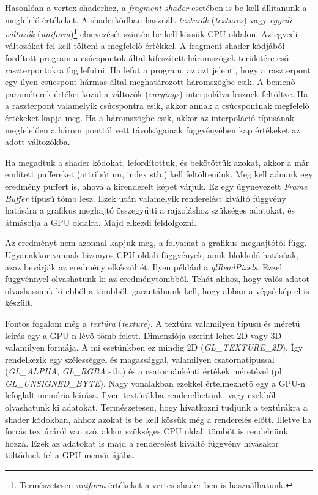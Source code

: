 \documentclass[12pt]{report}
\theoremstyle{definition}
\newcommand{\inenglish}[1]{\textsl{#1}}
\newcommand{\func}[1]{{\textsl{#1}}}
\begin{document}
Hasonlóan a vertex shaderhez, a \emph{fragment shader} esetében is be kell
állítanunk a megfelelő értékeket. A shaderkódban használt \emph{texturák}
(\inenglish{textures}) vagy \emph{egyedi változók}
(\inenglish{uniform})\footnote{Természetesen \func{uniform} értékeket a vertes
shader-ben is használhatunk.} elnevezését szintén be kell kössük CPU oldalon.
Az egyedi változókat fel kell tölteni a megfelelő értékkel. A fragment shader
kódjából fordított program a csúcspontok által kifeszített háromszögek
területére eső raszterpontokra fog lefutni.  Ha lefut a program, az azt
jelenti, hogy a raszterpont egy ilyen csúcspont-hármas által meghatározott
háromszögbe esik. A bemenő paraméterek értékei közül a változók
(\inenglish{varyings}) interpolálva lesznek feltöltve. Ha a raszterpont
valamelyik csúcspontra esik, akkor annak a csúcspontnak megfelelő értékeket
kapja meg. Ha a háromszögbe esik, akkor az interpoláció típusának megfelelően a
három ponttól vett távolságainak függvényében kap értékeket az adott
változókba.

Ha megadtuk a shader kódokat, lefordítottuk, és bekötöttük azokat, akkor a már
említett puffereket (attribútum, index stb.) kell feltöltenünk. Meg kell adnunk
egy eredmény puffert is, ahová a kirenderelt képet várjuk. Ez egy úgynevezett
\func{Frame Buffer} típusú tömb lesz. Ezek után valamelyik renderelést kiváltó
függvény hatására a grafikus meghajtó összegyűjti a rajzoláshoz szükséges
adatokat, és átmásolja a GPU oldalra. Majd elkezdi feldolgozni.

Az eredményt nem azonnal kapjuk meg, a folyamat a grafikus meghajtótól függ.
Ugyanakkor vannak bizonyos CPU oldali függvények, amik blokkoló hatásúak, azaz
bevárják az eredmény elkészültét. Ilyen például a \func{glReadPixels}. Ezzel
függvénnyel olvashatunk ki az eredménytömbből. Tehát ahhoz, hogy valós adatot
olvashassunk ki ebből a tömbből, garantálnunk kell, hogy abban a végső kép el
is készült.

Fontos fogalom még a \emph{textúra} (\inenglish{texture}). A textúra valamilyen
típusú és méretű leírás egy a GPU-n lévő tömb felett. Dimenziója szerint lehet
2D vagy 3D valamilyen formája. A mi esetünkben ez mindig 2D
(\func{GL\_TEXTURE\_2D}). Így rendelkezik egy szélességgel és magassággal,
valamilyen csatornatípussal (\func{GL\_ALPHA}, \func{GL\_RGBA} stb.) és a
csatornánkénti értékek méretével (pl. \func{GL\_UNSIGNED\_BYTE}). Nagy
vonalakban ezekkel értelmezhető egy a GPU-n lefoglalt memória leírása. Ilyen
textúrákba renderelhetünk, vagy ezekből olvashatunk ki adatokat. Természetesen,
hogy hívatkozni tudjunk a textúrákra a shader kódokban, ahhoz azokat is be kell
kössük még a renderelés előtt. Illetve ha forrás textúráról van szó, akkor
szükséges CPU oldali tömböt is rendelnünk hozzá. Ezek az adatokat is majd a
renderelést kiváltó függvény hívásakor töltődnek fel a GPU memóriájába.
\end{document}
